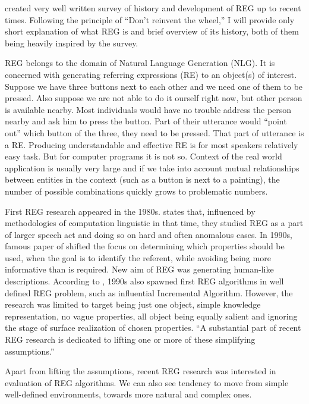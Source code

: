 \citet{krahmer2012computational} created very well written survey of history and development of REG up to recent times. Following the principle of ``Don't reinvent the wheel,'' I will provide only short explanation of what REG is and brief overview of its history, both of them being heavily inspired by the survey.

REG belongs to the domain of Natural Language Generation (NLG). It is concerned with generating referring expressions (RE) to an object(s) of interest. Suppose we have three buttons next to each other and we need one of them to be pressed. Also suppose we are not able to do it ourself right now, but other person is available nearby. Most individuals would have no trouble address the person nearby and ask him to press the button. Part of their utterance would ``point out'' which button of the three, they need to be pressed. That part of utterance is a RE. Producing understandable and effective RE is for most speakers relatively easy task. But for computer programs it is not so. Context of the real world application is usually very large and if we take into account mutual relationships between entities in the context (such as a button is next to a painting), the number of possible combinations quickly grows to problematic numbers. 

First REG research appeared in the 1980s. \citet{krahmer2012computational} states that, influenced by methodologies of computation linguistic in that time, they studied REG as a part of larger speech act and doing so on hard and often anomalous cases. In 1990s, famous paper of \citet{dale1995computational} shifted the focus on determining which properties should be used, when the goal is to identify the referent, while avoiding being more informative than is required. New aim of REG was generating human-like descriptions.  According to  \citet{krahmer2012computational}, 1990s also spawned first REG algorithms in well defined REG problem, such as influential Incremental Algorithm. However, the research was limited to target being just one object, simple knowledge representation, no vague properties, all object being equally salient and ignoring the stage of surface realization of chosen properties. ``A substantial part of recent REG research is dedicated to lifting one or more of these simplifying assumptions.'' \citep{krahmer2012computational} 

Apart from lifting the assumptions, recent REG research was interested in evaluation of REG algorithms. We can also see tendency to move from simple well-defined environments, towards more natural and complex ones.


